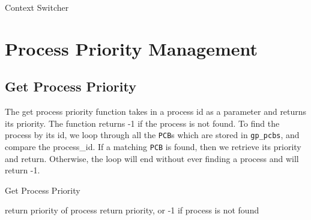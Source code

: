 \documentclass[12pt]{report}
\begin{document}
\begin{algorithm}[H]
  \caption{Context Switcher}
  \begin{algorithmic}[1]
				\EndIf
			\EndIf
		\EndIf
	  \EndIf
	  
		\EndIf
	
	  \EndIf
	\EndProcedure
  \end{algorithmic}
\end{algorithm}


\section{Process Priority Management}

\subsection{Get Process Priority}

The get process priority function takes in a process id as a parameter and returns its priority. The function returns -1 if the process is not found. To find the process by its id, we loop through all the \texttt{PCB}s which are stored in \texttt{gp_pcbs}, and compare the process_id. If a matching \texttt{PCB} is found, then we retrieve its priority and return. Otherwise, the loop will end without ever finding a process and will return -1.

\begin{algorithm}[H]
  \caption{Get Process Priority}
  \begin{algorithmic}[1]
      \State return priority of process
     \EndIf
  \EndFor
  \State return priority, or -1 if process is not found
  \EndFunction
  \end{algorithmic}
\end{algorithm}
\end{document}
